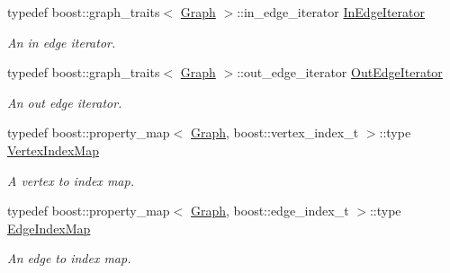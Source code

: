 \begin{DoxyCompactItemize}
typedef boost\+::graph\+\_\+traits$<$ \hyperlink{classGoGraph_aae4ae00d4785dcee01a514feb768f380}{Graph} $>$\+::in\+\_\+edge\+\_\+iterator \hyperlink{classGoGraph_a749886e553031dcb52c595989129514d}{In\+Edge\+Iterator}
\begin{DoxyCompactList}\small\item\em An in edge iterator. \end{DoxyCompactList}\item 
typedef boost\+::graph\+\_\+traits$<$ \hyperlink{classGoGraph_aae4ae00d4785dcee01a514feb768f380}{Graph} $>$\+::out\+\_\+edge\+\_\+iterator \hyperlink{classGoGraph_a40291cfa00013cbb9cfb400c1fc92379}{Out\+Edge\+Iterator}
\begin{DoxyCompactList}\small\item\em An out edge iterator. \end{DoxyCompactList}\item 
typedef boost\+::property\+\_\+map$<$ \hyperlink{classGoGraph_aae4ae00d4785dcee01a514feb768f380}{Graph}, boost\+::vertex\+\_\+index\+\_\+t $>$\+::type \hyperlink{classGoGraph_a8a262d8dedc41830e5d4208d4d5e76c3}{Vertex\+Index\+Map}
\begin{DoxyCompactList}\small\item\em A vertex to index map. \end{DoxyCompactList}\item 
typedef boost\+::property\+\_\+map$<$ \hyperlink{classGoGraph_aae4ae00d4785dcee01a514feb768f380}{Graph}, boost\+::edge\+\_\+index\+\_\+t $>$\+::type \hyperlink{classGoGraph_a1fd5f6b3ef1f58a665bbc8e317be9817}{Edge\+Index\+Map}
\begin{DoxyCompactList}\small\item\em An edge to index map. \end{DoxyCompactList}\end{DoxyCompactItemize}
